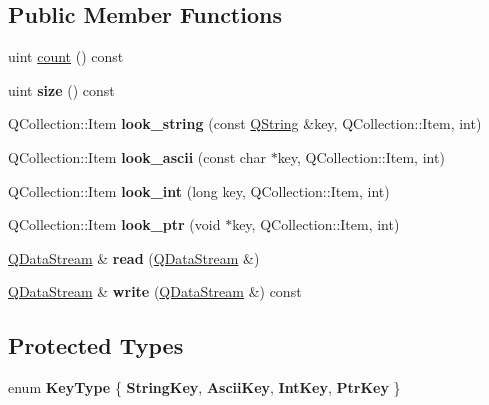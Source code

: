 \subsection*{Public Member Functions}
\begin{DoxyCompactItemize}
\item 
uint \mbox{\hyperlink{class_q_g_dict_a13f6cc9bdbfe37db323b47947c1e017c}{count}} () const
\item 
\mbox{\label{class_q_g_dict_a0844214b5a0f6f3d3df655c1f84e7f4a}} 
uint {\bfseries size} () const
\item 
\mbox{\label{class_q_g_dict_a1de8c35b775f7918acdf148b5df41fe4}} 
Q\+Collection\+::\+Item {\bfseries look\+\_\+string} (const \mbox{\hyperlink{class_q_string}{Q\+String}} \&key, Q\+Collection\+::\+Item, int)
\item 
\mbox{\label{class_q_g_dict_a6ad3fe3b248746cb4689f884f36404a0}} 
Q\+Collection\+::\+Item {\bfseries look\+\_\+ascii} (const char $\ast$key, Q\+Collection\+::\+Item, int)
\item 
\mbox{\label{class_q_g_dict_a4d517bb4a5a9d6257d6ffd60597f7621}} 
Q\+Collection\+::\+Item {\bfseries look\+\_\+int} (long key, Q\+Collection\+::\+Item, int)
\item 
\mbox{\label{class_q_g_dict_a9ee35841e4c40a244c54cc7fcf519649}} 
Q\+Collection\+::\+Item {\bfseries look\+\_\+ptr} (void $\ast$key, Q\+Collection\+::\+Item, int)
\item 
\mbox{\label{class_q_g_dict_a698c24588a7688bd9c618c17ba2fd7bb}} 
\mbox{\hyperlink{class_q_data_stream}{Q\+Data\+Stream}} \& {\bfseries read} (\mbox{\hyperlink{class_q_data_stream}{Q\+Data\+Stream}} \&)
\item 
\mbox{\label{class_q_g_dict_a258bcd2d51646c8a81ec27c024650447}} 
\mbox{\hyperlink{class_q_data_stream}{Q\+Data\+Stream}} \& {\bfseries write} (\mbox{\hyperlink{class_q_data_stream}{Q\+Data\+Stream}} \&) const
\end{DoxyCompactItemize}
\subsection*{Protected Types}
\begin{DoxyCompactItemize}
\item 
\mbox{\label{class_q_g_dict_a4eced3c3c4e5c52360bc2f1bab85412e}} 
enum {\bfseries Key\+Type} \{ {\bfseries String\+Key}, 
{\bfseries Ascii\+Key}, 
{\bfseries Int\+Key}, 
{\bfseries Ptr\+Key}
 \}
\end{DoxyCompactItemize}
